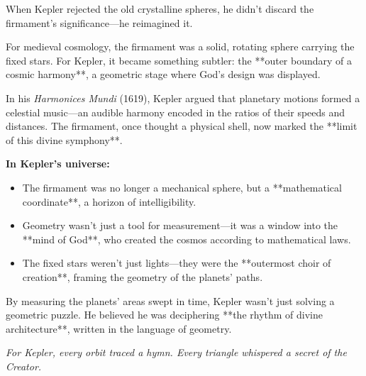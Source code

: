 \begin{tcolorbox}[colback=gray!5, colframe=black, title=\textbf{Historical Sidebar: Kepler’s Firmament as a Harmonic Horizon}, fonttitle=\bfseries, arc=1.5mm, boxrule=0.4pt]

  When Kepler rejected the old crystalline spheres, he didn’t discard the firmament’s significance—he reimagined it.
  
  For medieval cosmology, the firmament was a solid, rotating sphere carrying the fixed stars. For Kepler, it became something subtler: the **outer boundary of a cosmic harmony**, a geometric stage where God’s design was displayed.
  
  In his \textit{Harmonices Mundi} (1619), Kepler argued that planetary motions formed a celestial music—an audible harmony encoded in the ratios of their speeds and distances. The firmament, once thought a physical shell, now marked the **limit of this divine symphony**.
  
  \medskip
  
  \textbf{In Kepler’s universe:}
  
  \begin{itemize}
    \item The firmament was no longer a mechanical sphere, but a **mathematical coordinate**, a horizon of intelligibility.
    \item Geometry wasn’t just a tool for measurement—it was a window into the **mind of God**, who created the cosmos according to mathematical laws.
    \item The fixed stars weren’t just lights—they were the **outermost choir of creation**, framing the geometry of the planets’ paths.
  \end{itemize}
  
  By measuring the planets’ areas swept in time, Kepler wasn’t just solving a geometric puzzle. He believed he was deciphering **the rhythm of divine architecture**, written in the language of geometry.
  
  \begin{center}
  \emph{For Kepler, every orbit traced a hymn. Every triangle whispered a secret of the Creator.}
  \end{center}
  
\end{tcolorbox}
